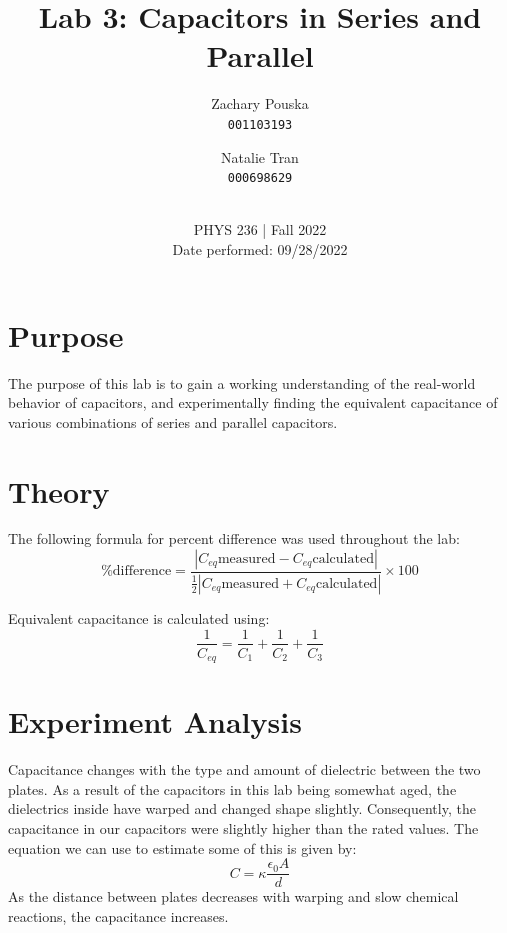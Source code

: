 \documentclass[titlepage]{article}
\begin{document}
\title{\textbf{Lab 3: Capacitors in Series and Parallel}}
\author{
    Zachary Pouska\\
    \texttt{001103193}\\
    \and
    Natalie Tran \\ 
    \texttt{000698629}\\ \\
} 

\date{PHYS 236 | Fall 2022\\
Date performed: 09/28/2022}


	\maketitle



	\section{Purpose}
    The purpose of this lab is to gain a working understanding of the real-world behavior of capacitors, and experimentally finding the equivalent capacitance of various combinations of series and parallel capacitors.

	\section{Theory}	

    The following formula for percent difference was used throughout the lab: $$\text{\% difference} = \frac{|C_{eq}\text{measured} - C_{eq}\text{calculated} |}{\frac{1}{2} |C_{eq}\text{measured} + C_{eq}\text{calculated}|} \times 100$$

    Equivalent capacitance is calculated using: 
    $$\frac{1}{C_{eq}} = \frac{1}{C_1}+\frac{1}{C_2} + \frac{1}{C_3}
    $$




	\section{Experiment Analysis}
    Capacitance changes with the type and amount of dielectric between the two plates. As a result of the capacitors in this lab being somewhat aged, the dielectrics inside have warped and changed shape slightly. Consequently, the capacitance in our capacitors were slightly higher than the rated values. The equation we can use to estimate some of this is given by: $$ C=\kappa \frac{\epsilon _0 A}{d}$$
    As the distance between plates decreases with warping and slow chemical reactions, the capacitance increases.
\end{document}
